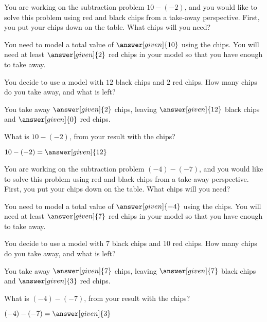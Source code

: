 \documentclass[nooutcomes]{ximera}
\begin{document}
\begin{question}
You are working on the subtraction problem $10 - (-2)$, and you would like to solve this problem using red and black chips from a take-away perspective.  First, you put your chips down on the table.  What chips will you need?

\begin{prompt}
You need to model a total value of $\answer[given]{10}$ using the chips.  You will need at least $\answer[given]{2}$ red chips in your model so that you have enough to take away.
\end{prompt}
\begin{question}
You decide to use a model with $12$ black chips and $2$ red chips.  How many chips do you take away, and what is left?

\begin{prompt}
You take away $\answer[given]{2}$  chips, leaving $\answer[given]{12}$ black chips and $\answer[given]{0}$ red chips.
\end{prompt}
\begin{question}
What is $10 - (-2)$, from your result with the chips?

\begin{prompt}
$10 - (-2) = \answer[given]{12}$
\end{prompt}
\end{question}
\end{question}
\end{question}


\begin{question}
You are working on the subtraction problem $(-4) - (-7)$, and you would like to solve this problem using red and black chips from a take-away perspective.  First, you put your chips down on the table.  What chips will you need?

\begin{prompt}
You need to model a total value of $\answer[given]{-4}$ using the chips.  You will need at least $\answer[given]{7}$ red chips in your model so that you have enough to take away.
\end{prompt}

\begin{question}
You decide to use a model with $7$ black chips and $10$ red chips.  How many chips do you take away, and what is left?

\begin{prompt}
You take away $\answer[given]{7}$  chips, leaving $\answer[given]{7}$ black chips and $\answer[given]{3}$ red chips.
\end{prompt}

\begin{question}
What is $(-4) - (-7)$, from your result with the chips?

\begin{prompt}
$(-4) - (-7) = \answer[given]{3}$
\end{prompt}
\end{question}
\end{question}
\end{question}
\end{document}
